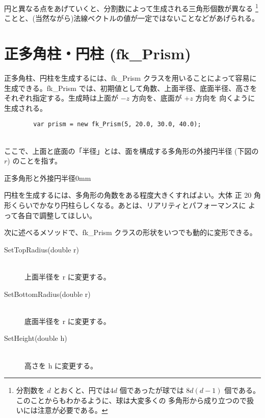円と異なる点をあげていくと、分割数によって生成される三角形個数が異なる
\footnote{分割数を \(d\) とおくと、円では\(4d\) 個であったが球では
\(8d(d-1)\) 個である。このことからもわかるように、球は大変多くの
多角形から成り立つので扱いには注意が必要である。}
ことと、(当然ながら)法線ベクトルの値が一定ではないことなどがあげられる。

\section{正多角柱・円柱 (fk\_Prism)}
正多角柱、円柱を生成するには、fk\_Prism クラスを用いることによって容易に
生成できる。fk\_Prism では、初期値として角数、上面半径、底面半径、高さを
それぞれ指定する。生成時は上面が \(-z\) 方向を、底面が \(+z\) 方向を
向くように生成される。
\\
\begin{screen}
\begin{verbatim}
        var prism = new fk_Prism(5, 20.0, 30.0, 40.0);
\end{verbatim}
\end{screen}
~ \\
ここで、上面と底面の「半径」とは、面を構成する多角形の外接円半径
(下図の \(r\)) のことを指す。

	{正多角形と外接円半径}{0mm}

円柱を生成するには、多角形の角数をある程度大きくすればよい。大体
正 20 角形くらいでかなり円柱らしくなる。あとは、リアリティとパフォーマンスに
よって各自で調整してほしい。

次に述べるメソッドで、fk\_Prism クラスの形状をいつでも動的に変形できる。
\begin{description}
\item[SetTopRadius(double r)] ~ \\
	上面半径を r に変更する。\\

\item[SetBottomRadius(double r)] ~ \\
	底面半径を r に変更する。\\

\item[SetHeight(double h)] ~ \\
	高さを h に変更する。
\end{description}

